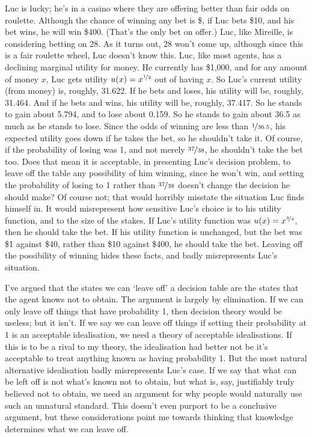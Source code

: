 \documentclass[11pt,]{book}
\begin{document}
Luc is lucky; he's in a casino where they are offering better than fair odds on roulette. Although the chance of winning any bet is \$, if Luc bets \$10, and his bet wins, he will win \$400. (That's the only bet on offer.) Luc, like Mireille, is considering betting on 28. As it turns out, 28 won't come up, although since this is a fair roulette wheel, Luc doesn't know this. Luc, like most agents, has a declining marginal utility for money. He currently has \$1,000, and for any amount of money \(x\), Luc gets utility \(u(x) = x^{\nicefrac{1}{2}}\) out of having \(x\). So Luc's current utility (from money) is, roughly, 31.622. If he bets and loses, his utility will be, roughly, 31.464. And if he bets and wins, his utility will be, roughly, 37.417. So he stands to gain about 5.794, and to lose about 0.159. So he stands to gain about 36.5 as much as he stands to lose. Since the odds of winning are less than \(\nicefrac{1}{36.5}\), his expected utility goes down if he takes the bet, so he shouldn't take it. Of course, if the probability of losing was 1, and not merely \(\nicefrac{37}{38}\), he shouldn't take the bet too. Does that mean it is acceptable, in presenting Luc's decision problem, to leave off the table any possibility of him winning, since he won't win, and setting the probability of losing to 1 rather than \(\nicefrac{37}{38}\) doesn't change the decision he should make? Of course not; that would horribly misstate the situation Luc finds himself in. It would misrepresent how sensitive Luc's choice is to his utility function, and to the size of the stakes. If Luc's utility function was \(u(x) = x^{\nicefrac{3}{4}}\), then he should take the bet. If his utility function is unchanged, but the bet was \$1 against \$40, rather than \$10 against \$400, he should take the bet. Leaving off the possibility of winning hides these facts, and badly misrepresents Luc's situation.

I've argued that the states we can `leave off' a decision table are the states that the agent knows not to obtain. The argument is largely by elimination. If we can only leave off things that have probability 1, then decision theory would be useless; but it isn't. If we say we can leave off things if setting their probability at 1 is an acceptable idealisation, we need a theory of acceptable idealisations. If this is to be a rival to my theory, the idealisation had better not be it's acceptable to treat anything known as having probability 1. But the most natural alternative idealisation badly misrepresents Luc's case. If we say that what can be left off is not what's known not to obtain, but what is, say, justifiably truly believed not to obtain, we need an argument for why people would naturally use such an unnatural standard. This doesn't even purport to be a conclusive argument, but these considerations point me towards thinking that knowledge determines what we can leave off.
\end{document}
